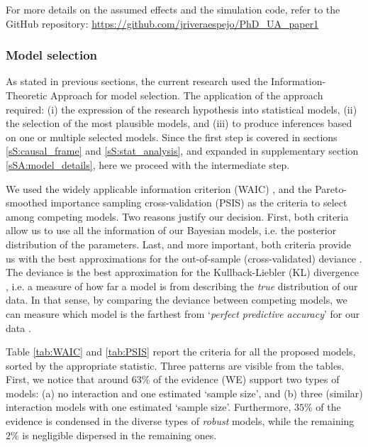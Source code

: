 For more details on the assumed effects and the simulation code, refer to the GitHub repository: \url{https://github.com/jriveraespejo/PhD_UA_paper1}
%
%
\subsubsection{Model selection} \label{ssSA:model_selection}
%
As stated in previous sections, the current research used the Information-Theoretic Approach \citep{Anderson_2008, Chamberlain_1965} for model selection. The application of the approach required: (i) the expression of the research hypothesis into statistical models, (ii) the selection of the most plausible models, and (iii) to produce inferences based on one or multiple selected models. Since the first step is covered in sections \ref{sS:causal_frame} and \ref{sS:stat_analysis}, and expanded in supplementary section \ref{sSA:model_details}, here we proceed with the intermediate step. 

We used the widely applicable information criterion (WAIC) \citep{Watanabe_2013}, and the Pareto-smoothed importance sampling cross-validation (PSIS) \citep{Vehtari_et_al_2021} as the criteria to select among competing models. Two reasons justify our decision. First, both criteria allow us to use all the information of our Bayesian models, i.e. the posterior distribution of the parameters. Last, and more important, both criteria provide us with the best approximations for the out-of-sample (cross-validated) deviance \citep{McElreath_2020}. The deviance is the best approximation for the Kullback-Liebler (KL) divergence \citep{Kullback_et_al_1951}, i.e. a measure of how far a model is from describing the \textit{true} distribution of our data. In that sense, by comparing the deviance between competing models, we can measure which model is the farthest from `\textit{perfect predictive accuracy}' for our data \cite{McElreath_2020}.

Table \ref{tab:WAIC} and \ref{tab:PSIS} report the criteria for all the proposed models, sorted by the appropriate statistic. Three patterns are visible from the tables. First, we notice that around $63\%$ of the evidence (WE) support two types of models: (a) no interaction and one estimated `sample size', and (b) three (similar) interaction models with one estimated `sample size'. Furthermore, $35\%$ of the evidence is condensed in the diverse types of \textit{robust} models, while the remaining $2\%$ is negligible dispersed in the remaining ones.

